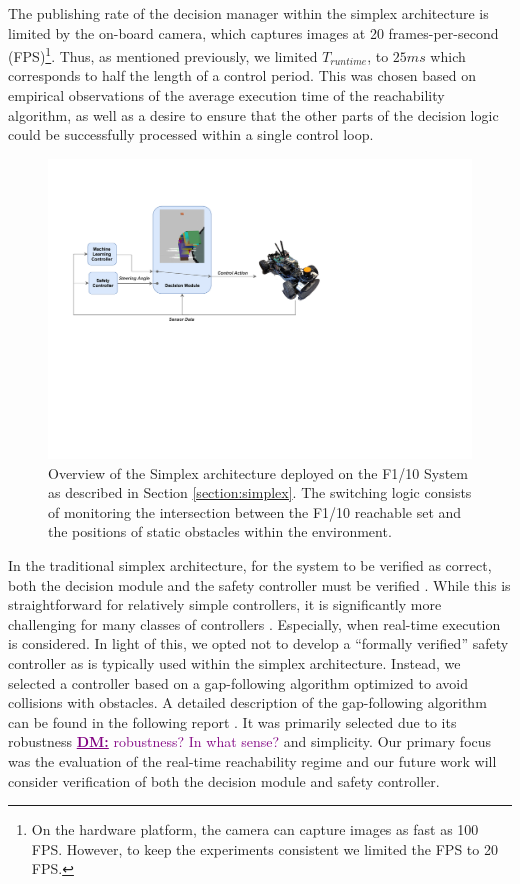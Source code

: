 \documentclass[manuscript,screen,review]{acmart}
\newcommand{\todo}[1]{\textcolor{red}{\textbf{\underline{TODO:}} #1}}
\newcommand{\diego}[1]{\textcolor{purple}{\textbf{\underline{DM:}} #1}}
\begin{document}
The publishing rate of the decision manager within the simplex architecture is limited by the on-board camera, which captures images at 20 frames-per-second (FPS)\footnote{On the hardware platform, the camera can capture images as fast as 100 FPS. However, to keep the experiments consistent we limited the FPS to 20 FPS.}. Thus, as mentioned previously, we limited $T_{runtime}$, to $25 ms$ which corresponds to half the length of a control period. This was chosen based on empirical observations of the average execution time of the reachability algorithm, as well as a desire to ensure that the other parts of the decision logic could be successfully processed within a single control loop.

\begin{figure}[htbp]%
  \centering
  \includegraphics[width=0.7\linewidth]{figures/simplex_simple_v2.pdf}
  \caption{Overview of the Simplex architecture deployed on the F1/10 System as described in Section \ref{section:simplex}. The switching logic consists of monitoring the intersection between the F1/10 reachable set and the positions of static obstacles within the environment.}
  \label{fig:simplex_arch}
\end{figure}%


In the traditional simplex architecture, for the system to be verified as correct, both the decision module and the safety controller must be verified \cite{Mehmood2021}. While this is straightforward for relatively simple controllers, it is significantly more challenging for many classes of controllers \cite{ivanov2020case}. Especially, when real-time execution is considered. In light of this, we opted not to develop a ``formally verified'' safety controller as is typically used within the simplex architecture. Instead, we selected a controller based on a gap-following algorithm optimized to avoid collisions with obstacles. A detailed description of the gap-following algorithm can be found in the following report \cite{otterness_2019}. It was primarily selected due to its robustness \diego{robustness? In what sense?} and simplicity.  Our primary focus was the evaluation of the real-time reachability regime and our future work will consider verification of both the decision module and safety controller. 
\end{document}

